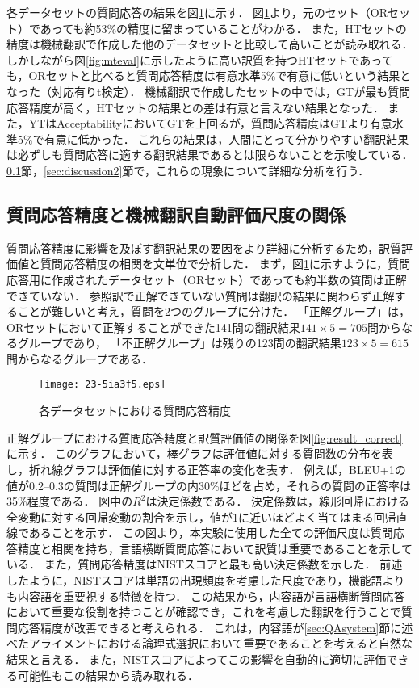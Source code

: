 \documentclass[japanese]{jnlp_1.4}
\begin{document}
各データセットの質問応答の結果を図\ref{fig:QAaccuracy}に示す．
図\ref{fig:QAaccuracy}より，元のセット（ORセット）であっても約53\%の精度に留まっていることがわかる．
また，HTセットの精度は機械翻訳で作成した他のデータセットと比較して高いことが読み取れる．
しかしながら図\ref{fig:mteval}に示したように高い訳質を持つHTセットであっても，ORセットと比べると質問応答精度は{有意水準5\%で}有意に低いという結果となった（対応有りt検定）．
{機械翻訳で作成したセットの中では，GTが最も質問応答精度が高く，HTセットの結果との差は有意と言えない結果となった．}
また，YTはAcceptabilityにおいてGTを上回るが，質問応答精度はGTより{有意水準5\%で}有意に低かった．
これらの結果は，{人間にとって分かりやすい翻訳結果は必ずしも質問応答に適する翻訳結果であるとは限らないことを示唆している}．
\ref{sec:discussion1}節，\ref{sec:discussion2}節で，これらの現象について詳細な分析を行う．


\subsection{質問応答精度と機械翻訳自動評価尺度の関係}
\label{sec:discussion1}

質問応答精度に影響を及ぼす翻訳結果の要因をより詳細に分析するため，訳質評価値と質問応答精度の相関を文単位で分析した．
まず，図{\ref{fig:QAaccuracy}}に示すように，質問応答用に作成されたデータセット（ORセット）であっても約半数の質問は正解できていない．
参照訳で正解できていない質問は翻訳の結果に関わらず正解することが難しいと考え，質問を2つのグループに分けた．
「正解グループ」は，ORセットにおいて正解することができた141問の翻訳結果$141\times5=705$問からなるグループであり，
「不正解グループ」は残りの123問の翻訳結果$123\times5=615$問からなるグループである．

\begin{figure}[t]
\begin{center}
\texttt{[image: 23-5ia3f5.eps]}
\end{center}
\caption{各データセットにおける質問応答精度}
\label{fig:QAaccuracy}
\end{figure}

正解グループにおける質問応答精度と訳質評価値の関係を図\ref{fig:result_correct}に示す．
このグラフにおいて，棒グラフは評価値に対する質問数の分布を表し，折れ線グラフは評価値に対する正答率の変化を表す．
例えば，BLEU+1の値が0.2--0.3の質問は正解グループの内30\%ほどを占め，それらの質問の正答率は35\%程度である．
図中の$R^2$は決定係数である．
決定係数は，線形回帰における全変動に対する回帰変動の割合を示し，値が1に近いほどよく当てはまる回帰直線であることを示す．
この図より，本実験に使用した全ての評価尺度は質問応答精度と相関を持ち，言語横断質問応答において訳質は重要であることを示している．
また，質問応答精度はNISTスコアと最も高い決定係数を示した．
前述したように，NISTスコアは単語の出現頻度を考慮した尺度であり，機能語よりも内容語を重要視する特徴を持つ．
この結果から，内容語が言語横断質問応答において重要な役割を持つことが確認でき，これを考慮した翻訳を行うことで質問応答精度が改善できると考えられる．
これは，内容語が\ref{sec:QAsystem}節に述べたアライメントにおける論理式選択において重要であることを考えると自然な結果と言える．
また，NISTスコアによってこの影響を自動的に適切に評価できる可能性もこの結果から読み取れる．
\end{document}
